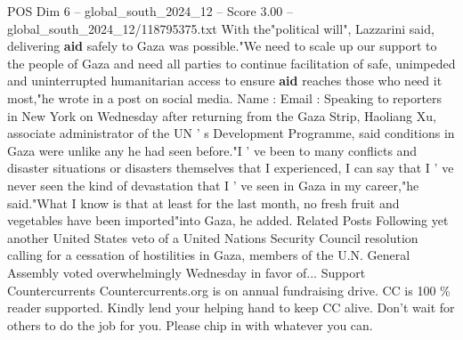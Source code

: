 \begin{textsample}{POS Dim 6 – global\_south\_2024\_12 – Score 3.00 – global\_south\_2024\_12/118795375.txt}
With the"political will", Lazzarini said, delivering \textbf{aid} safely to Gaza was possible."We need to scale up our support to the people of Gaza and need all parties to continue facilitation of safe, unimpeded and uninterrupted humanitarian access to ensure \textbf{aid} reaches those who need it most,"he wrote in a post on social media.
Name : Email : Speaking to reporters in New York on Wednesday after returning from the Gaza Strip, Haoliang Xu, associate administrator of the UN ' s Development Programme, said conditions in Gaza were unlike any he had seen before."I ' ve been to many conflicts and disaster situations or disasters themselves that I experienced, I can say that I ' ve never seen the kind of devastation that I ' ve seen in Gaza in my career,"he said."What I know is that at least for the last month, no fresh fruit and vegetables have been imported"into Gaza, he added.
Related Posts Following yet another United States veto of a United Nations Security Council resolution calling for a cessation of hostilities in Gaza, members of the U.N.
General Assembly voted overwhelmingly Wednesday in favor of...
Support Countercurrents Countercurrents.org is on annual fundraising drive.
CC is 100 \% reader supported.
Kindly lend your helping hand to keep CC alive.
Don't wait for others to do the job for you.
Please chip in with whatever you can.

\end{textsample}
